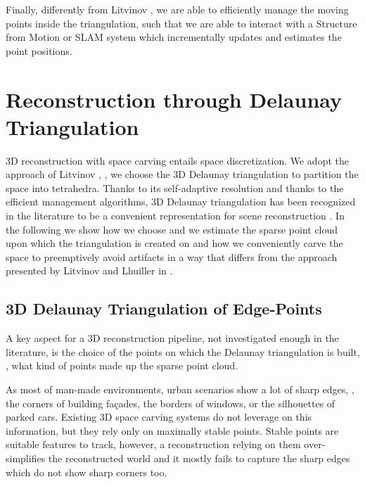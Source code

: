 Finally, differently from Litvinov \etal \cite{litvinov_lhuillier_13}, we are able to efficiently manage the moving points inside the triangulation, such that we are able to interact with a Structure from Motion or SLAM system which incrementally updates and estimates the point positions.



\section{Reconstruction through Delaunay Triangulation}
\label{sec:3D-Reconstruction}
3D reconstruction with space carving entails space discretization.
We adopt the approach of Litvinov \etal \cite{litvinov_lhuillier_13}, \ie, we choose the 3D Delaunay triangulation to partition the space into tetrahedra. 
Thanks to its self-adaptive resolution and thanks to the efficient management algorithms, 3D Delaunay triangulation has been recognized in the literature to be a convenient representation for scene reconstruction  \cite{litvinov_lhuillier_13, Pan_et_al09, labatut2007efficient, lovi_et_al_11}. 
In the following we show how we choose and we estimate the sparse point cloud upon which the triangulation is created on and how we conveniently carve the space to preemptively avoid artifacts in a  way that differs from the approach presented by Litvinov and Lhuiller in \cite{litvinov_Lhiuller14}.


\subsection{3D Delaunay Triangulation of Edge-Points}
\label{subsec:pcl_estimation}
A key aspect for a 3D reconstruction pipeline, not investigated enough in the literature, is the choice of the points on which the Delaunay triangulation is built, \ie, what kind of points made up the sparse point cloud.

As most of man-made environments, urban scenarios show a lot of sharp edges, \eg, the corners of building fa\c{c}ades, the borders of windows, or the silhouettes of parked cars. Existing 3D space carving systems do not leverage on this information, but they rely only on maximally stable points.
Stable points are suitable features to track, however, a reconstruction relying on them over-simplifies the reconstructed world and it mostly fails to capture the sharp edges which do not show sharp corners too.

